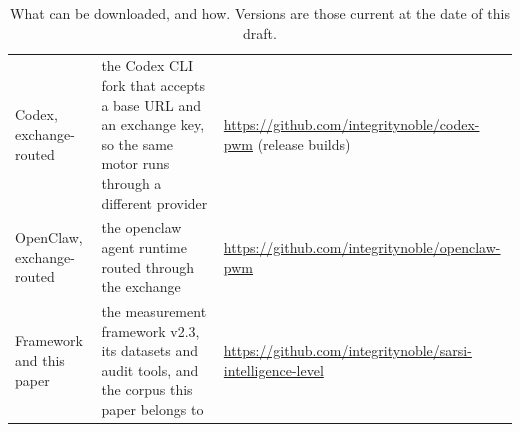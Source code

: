 \begin{table}[H]
\begin{tabularx}{\textwidth}{@{}lYY@{}}
Codex, exchange-routed & the Codex CLI fork that accepts a base URL and an exchange key, so the same motor runs through a different provider & \url{https://github.com/integritynoble/codex-pwm} (release builds) \\
OpenClaw, exchange-routed & the openclaw agent runtime routed through the exchange & \url{https://github.com/integritynoble/openclaw-pwm}\newline {}\allowbreak{} \\
Framework and this paper & the measurement framework v2.3, its datasets and audit tools, and the corpus this paper belongs to & \url{https://github.com/integritynoble/sarsi-intelligence-level} \\
\bottomrule
\end{tabularx}
\caption{What can be downloaded, and how. Versions are those current at the date of this draft.}
\label{tab:downloads}
\end{table}


